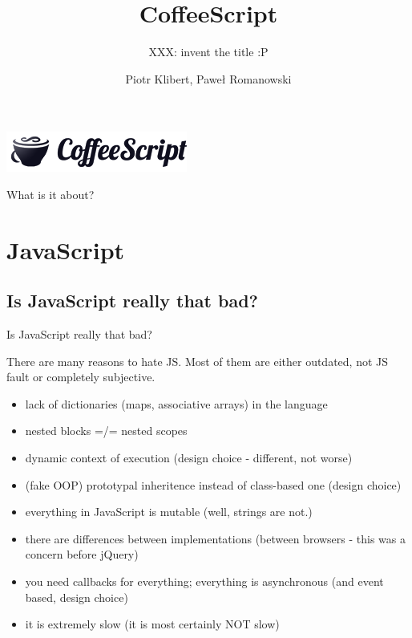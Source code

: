 \documentclass[xcolor=dvipsnames]{beamer}
\title{CoffeeScript}
\subtitle{XXX: invent the title :P}
\author{Piotr Klibert, Paweł Romanowski}
\begin{document}
\begin{frame}[plain]
    \begin{center}
        \includegraphics[scale=0.25]{img/logo.png}
    \end{center}
    \titlepage
\end{frame}

\begin{frame}{What is it about?}
    \tableofcontents
\end{frame}




\section{JavaScript}

\subsection{Is JavaScript really that bad?}
\begin{frame}[fragile]{}
    Is JavaScript really that bad?
\end{frame}

\begin{frame}[fragile]{There are many reasons to hate JS.}
    Most of them are either outdated, not JS fault or completely subjective.
    \begin{itemize}
        \item lack of dictionaries (maps, associative arrays) in the language
        \item nested blocks =/= nested scopes
        \item dynamic context of execution (design choice - different, not worse)
        \item (fake OOP) prototypal inheritence instead of class-based one (design choice)
        \item everything in JavaScript is mutable (well, strings are not.)
        \item there are differences between implementations (between browsers - this was a concern before jQuery)
        \item you need callbacks for everything; everything is asynchronous (and event based, design choice)
        \item it is extremely slow (it is most certainly NOT slow)
    \end{itemize}
\end{frame}
\end{document}
